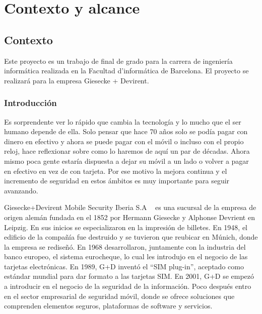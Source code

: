\documentclass[12pt]{article}
\begin{document}
    \tableofcontents
    \listoffigures
    \listoftables
    \newpage
    \section{Contexto y alcance}\label{sec:Contexto y alcance}
    
    \subsection{Contexto}

   Este proyecto es un trabajo de final de grado para la carrera de ingeniería informática realizada en la Facultad d'informática de Barcelona. El proyecto se realizará para la empresa Giesecke + Devirent.
    
    \subsubsection{Introducción}
    Es sorprendente ver lo rápido que cambia la tecnología y lo mucho que el ser humano depende de ella. Solo pensar que hace 70 años solo se podía pagar con dinero en efectivo y ahora se puede pagar con el móvil o incluso con el propio reloj, hace reflexionar sobre como lo haremos de aquí un par de décadas.  Ahora mismo poca gente estaría dispuesta a dejar su móvil a un lado o volver a pagar en efectivo en vez de con tarjeta. Por ese motivo la mejora continua y el incremento de seguridad en estos ámbitos es muy importante para seguir avanzando.
    
    \vspace{4mm}
    
    Giesecke+Devirent Mobile Security Iberia S.A ~\cite{1} es una sucursal de la empresa de origen alemán fundada en el 1852 por Hermann Giesecke y Alphonse Devrient en Leipzig. En sus inicios se especializaron en la impresión de billetes. En 1948, el edificio de la compañía fue destruido y se tuvieron que reubicar en Múnich, donde la empresa se rediseñó. En 1968 desarrollaron, juntamente con la industria del banco europeo, el sistema eurocheque, lo cual les introdujo en el negocio de las tarjetas electrónicas. En 1989, G+D inventó el “SIM plug-in”, aceptado como estándar mundial para dar formato a las tarjetas SIM.  En 2001, G+D se empezó a introducir en el negocio de la seguridad de la información. Poco después entro en el sector empresarial de seguridad móvil, donde se ofrece soluciones que comprenden elementos seguros, plataformas de software y servicios. ~\cite{2}
    
\end{document}
